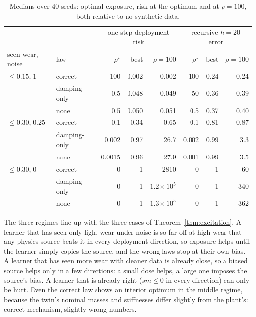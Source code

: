 \begin{table}[h]
\centering\small
\caption{Medians over 40 seeds: optimal exposure, risk at the optimum and at $\rho=100$, both relative to no synthetic data.}
\label{tab:exposure}
\setlength{\tabcolsep}{4pt}
\begin{tabular}{llrrrrrr}
\toprule
& & \multicolumn{3}{c}{one-step deployment risk} & \multicolumn{3}{c}{recursive $h=20$ error}\\
seen wear, noise & law & $\rho^\star$ & best & $\rho=100$ & $\rho^\star$ & best & $\rho=100$\\
\midrule
$\le0.15$, $1$ & correct & 100 & 0.002 & 0.002 & 100 & 0.24 & 0.24\\
 & damping-only & 0.5 & 0.048 & 0.049 & 50 & 0.36 & 0.39\\
 & none & 0.5 & 0.050 & 0.051 & 0.5 & 0.37 & 0.40\\
$\le0.30$, $0.25$ & correct & 0.1 & 0.34 & 0.65 & 0.1 & 0.81 & 0.87\\
 & damping-only & 0.002 & 0.97 & 26.7 & 0.002 & 0.99 & 3.3\\
 & none & 0.0015 & 0.96 & 27.9 & 0.001 & 0.99 & 3.5\\
$\le0.30$, $0$ & correct & 0 & 1 & 2810 & 0 & 1 & 60\\
 & damping-only & 0 & 1 & $1.2\times10^5$ & 0 & 1 & 340\\
 & none & 0 & 1 & $1.3\times10^5$ & 0 & 1 & 362\\
\bottomrule
\end{tabular}
\end{table}
The three regimes line up with the three cases of Theorem~\ref{thm:excitation}. A learner that has seen only light wear under noise is so far off at high wear that any physics source beats it in every deployment direction, so exposure helps until the learner simply copies the source, and the wrong laws stop at their own bias. A learner that has seen more wear with cleaner data is already close, so a biased source helps only in a few directions: a small dose helps, a large one imposes the source's bias. A learner that is already right ($sm\le0$ in every direction) can only be hurt. Even the correct law shows an interior optimum in the middle regime, because the twin's nominal masses and stiffnesses differ slightly from the plant's: correct mechanism, slightly wrong numbers.



